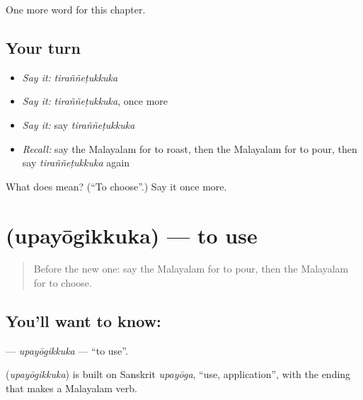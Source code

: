 \begin{grammarlens}[title={What you've built}]
One more word for this chapter.
\end{grammarlens}

\subsection*{Your turn}
\begin{itemize}
\raggedright
  \item \emph{Say it:} \emph{tiraññeṭukkuka}
  \item \emph{Say it:} \emph{tiraññeṭukkuka}, once more
  \item \emph{Say it:} say \emph{tiraññeṭukkuka}
  \item \emph{Recall:} say the Malayalam for to roast, then the Malayalam for to pour, then say \emph{tiraññeṭukkuka} again
\end{itemize}

\begin{tcolorbox}[breakable,colback=teal!4,colframe=teal!35!black,title={Before you move on}]
What does  mean? (\textquotedblleft{}To choose\textquotedblright{}.) Say it once more.
\end{tcolorbox}
\section[\texorpdfstring{\ml{ഉപയോഗിക്കുക} (upayōgikkuka)}{ഉപയോഗിക്കുക (upayōgikkuka)}]{ (upayōgikkuka) — to use}

\label{lesson:ML-C183-upayogikkuka}



\begin{quote}
Before the new one: say the Malayalam for to pour, then the Malayalam for to choose.
\end{quote}

\subsection*{You'll want to know: }
\textbf{} — \emph{upayōgikkuka} — \textquotedblleft{}to use\textquotedblright{}.

\begin{cousinweb}
\textbf{} (\emph{upayōgikkuka}) is built on Sanskrit \emph{upayōga}, \textquotedblleft{}use, application\textquotedblright{}, with the ending that makes a Malayalam verb.
\end{cousinweb}

